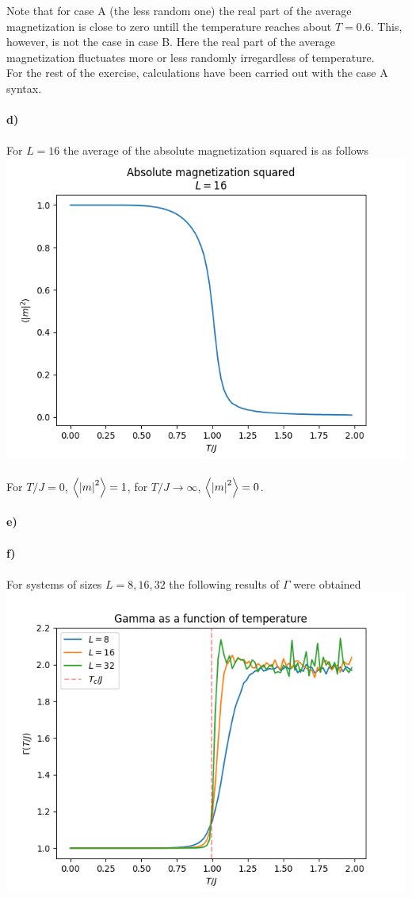\documentclass[12pt]{article}
\begin{document}
Note that for case A (the less random one) the real part of the average
magnetization is close to zero untill the temperature reaches about $T = 0.6$.
This, however, is not the case in case B. Here the real part of the average
magnetization fluctuates more or less randomly irregardless of temperature.\\
For the rest of the exercise, calculations have been carried out with the case
A syntax.\\
\\
\textbf{d)} \\
\\
For $L = 16$ the average of the absolute magnetization squared is as follows \\
\includegraphics[width = \textwidth]{ams.png} \\
\\
For $T/J = 0$, $\expval{\abs{m}^2} = 1$, for $T/J \to \infty$,
$\expval{\abs{m}^2} = 0$. \\
\\
\textbf{e)} \\
\\
\textbf{f)} \\
\\
For systems of sizes $L = {8, 16, 32}$ the following results of $\Gamma$ were
obtained\\
\includegraphics[width = \textwidth]{gamma.png}\\
\end{document}
